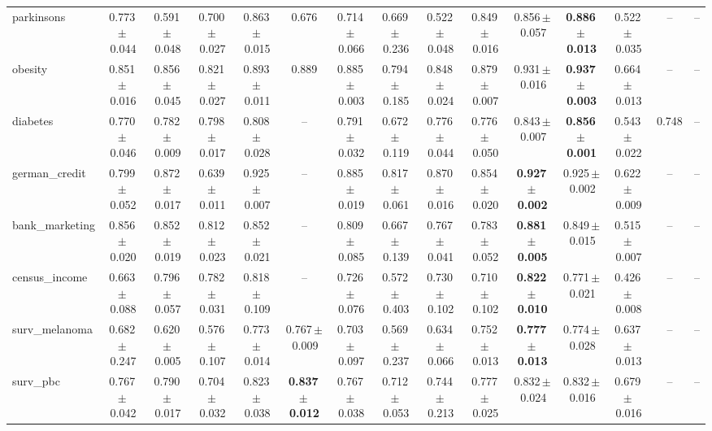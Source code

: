 \documentclass[8pt]{extarticle}
\begin{document}
\begin{longtable}{l*{14}{c}}
parkinsons & 0.773\,$\pm$\,0.044 & 0.591\,$\pm$\,0.048 & 0.700\,$\pm$\,0.027 & 0.863\,$\pm$\,0.015 & 0.676 & 0.714\,$\pm$\,0.066 & 0.669\,$\pm$\,0.236 & 0.522\,$\pm$\,0.048 & 0.849\,$\pm$\,0.016 & 0.856\,$\pm$\,0.057 & \textbf{0.886\,$\pm$\,0.013} & 0.522\,$\pm$\,0.035 & -- & -- \\
obesity & 0.851\,$\pm$\,0.016 & 0.856\,$\pm$\,0.045 & 0.821\,$\pm$\,0.027 & 0.893\,$\pm$\,0.011 & 0.889 & 0.885\,$\pm$\,0.003 & 0.794\,$\pm$\,0.185 & 0.848\,$\pm$\,0.024 & 0.879\,$\pm$\,0.007 & 0.931\,$\pm$\,0.016 & \textbf{0.937\,$\pm$\,0.003} & 0.664\,$\pm$\,0.013 & -- & -- \\
diabetes & 0.770\,$\pm$\,0.046 & 0.782\,$\pm$\,0.009 & 0.798\,$\pm$\,0.017 & 0.808\,$\pm$\,0.028 & -- & 0.791\,$\pm$\,0.032 & 0.672\,$\pm$\,0.119 & 0.776\,$\pm$\,0.044 & 0.776\,$\pm$\,0.050 & 0.843\,$\pm$\,0.007 & \textbf{0.856\,$\pm$\,0.001} & 0.543\,$\pm$\,0.022 & 0.748 & -- \\
german\_credit & 0.799\,$\pm$\,0.052 & 0.872\,$\pm$\,0.017 & 0.639\,$\pm$\,0.011 & 0.925\,$\pm$\,0.007 & -- & 0.885\,$\pm$\,0.019 & 0.817\,$\pm$\,0.061 & 0.870\,$\pm$\,0.016 & 0.854\,$\pm$\,0.020 & \textbf{0.927\,$\pm$\,0.002} & 0.925\,$\pm$\,0.002 & 0.622\,$\pm$\,0.009 & -- & -- \\
bank\_marketing & 0.856\,$\pm$\,0.020 & 0.852\,$\pm$\,0.019 & 0.812\,$\pm$\,0.023 & 0.852\,$\pm$\,0.021 & -- & 0.809\,$\pm$\,0.085 & 0.667\,$\pm$\,0.139 & 0.767\,$\pm$\,0.041 & 0.783\,$\pm$\,0.052 & \textbf{0.881\,$\pm$\,0.005} & 0.849\,$\pm$\,0.015 & 0.515\,$\pm$\,0.007 & -- & -- \\
census\_income & 0.663\,$\pm$\,0.088 & 0.796\,$\pm$\,0.057 & 0.782\,$\pm$\,0.031 & 0.818\,$\pm$\,0.109 & -- & 0.726\,$\pm$\,0.076 & 0.572\,$\pm$\,0.403 & 0.730\,$\pm$\,0.102 & 0.710\,$\pm$\,0.102 & \textbf{0.822\,$\pm$\,0.010} & 0.771\,$\pm$\,0.021 & 0.426\,$\pm$\,0.008 & -- & -- \\
surv\_melanoma & 0.682\,$\pm$\,0.247 & 0.620\,$\pm$\,0.005 & 0.576\,$\pm$\,0.107 & 0.773\,$\pm$\,0.014 & 0.767\,$\pm$\,0.009 & 0.703\,$\pm$\,0.097 & 0.569\,$\pm$\,0.237 & 0.634\,$\pm$\,0.066 & 0.752\,$\pm$\,0.013 & \textbf{0.777\,$\pm$\,0.013} & 0.774\,$\pm$\,0.028 & 0.637\,$\pm$\,0.013 & -- & -- \\
surv\_pbc & 0.767\,$\pm$\,0.042 & 0.790\,$\pm$\,0.017 & 0.704\,$\pm$\,0.032 & 0.823\,$\pm$\,0.038 & \textbf{0.837\,$\pm$\,0.012} & 0.767\,$\pm$\,0.038 & 0.712\,$\pm$\,0.053 & 0.744\,$\pm$\,0.213 & 0.777\,$\pm$\,0.025 & 0.832\,$\pm$\,0.024 & 0.832\,$\pm$\,0.016 & 0.679\,$\pm$\,0.016 & -- & -- \\

\end{longtable}
\end{document}
